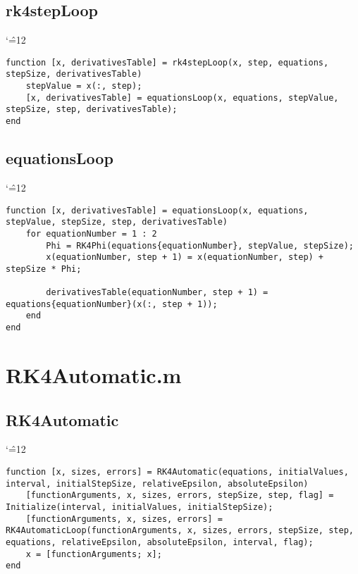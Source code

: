 \documentclass[12pt]{report}
\newenvironment{simplechar}{%
   \catcode`\^=12
}{}
\begin{document}
\subsection{rk4stepLoop}
\begin{simplechar}
\begin{lstlisting}
function [x, derivativesTable] = rk4stepLoop(x, step, equations, stepSize, derivativesTable)
    stepValue = x(:, step);
    [x, derivativesTable] = equationsLoop(x, equations, stepValue, stepSize, step, derivativesTable);
end
\end{lstlisting}
\end{simplechar}

\subsection{equationsLoop}
\begin{simplechar}
\begin{lstlisting}
function [x, derivativesTable] = equationsLoop(x, equations, stepValue, stepSize, step, derivativesTable)
    for equationNumber = 1 : 2
        Phi = RK4Phi(equations{equationNumber}, stepValue, stepSize);
        x(equationNumber, step + 1) = x(equationNumber, step) + stepSize * Phi;

        derivativesTable(equationNumber, step + 1) = equations{equationNumber}(x(:, step + 1));
    end
end
\end{lstlisting}
\end{simplechar}

\section{RK4Automatic.m}
\subsection{RK4Automatic}
\begin{simplechar}
\begin{lstlisting}
function [x, sizes, errors] = RK4Automatic(equations, initialValues, interval, initialStepSize, relativeEpsilon, absoluteEpsilon)
    [functionArguments, x, sizes, errors, stepSize, step, flag] = Initialize(interval, initialValues, initialStepSize);
    [functionArguments, x, sizes, errors] = RK4AutomaticLoop(functionArguments, x, sizes, errors, stepSize, step, equations, relativeEpsilon, absoluteEpsilon, interval, flag);
    x = [functionArguments; x];
end
\end{lstlisting}
\end{simplechar}
\end{document}
